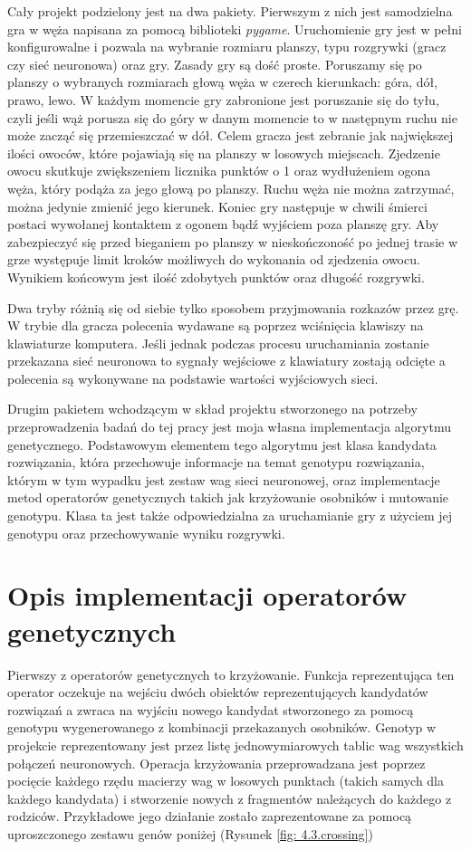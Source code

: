 \documentclass[12pt, oneside, a4paper]{report}
\begin{document}
Cały projekt podzielony jest na dwa pakiety. Pierwszym z nich jest samodzielna gra w węża napisana za pomocą biblioteki \textit{pygame}. Uruchomienie gry jest w pełni konfigurowalne i pozwala na wybranie rozmiaru planszy, typu rozgrywki (gracz czy sieć neuronowa) oraz gry. Zasady gry są dość proste. Poruszamy się po planszy o wybranych rozmiarach głową węża w czerech kierunkach: góra, dół, prawo, lewo. W każdym momencie gry zabronione jest poruszanie się do tyłu, czyli jeśli wąż porusza się do góry w danym momencie to w następnym ruchu nie może zacząć się przemieszczać w dół. Celem gracza jest zebranie jak największej ilości owoców, które pojawiają się na planszy w losowych miejscach. Zjedzenie owocu skutkuje zwiększeniem licznika punktów o 1 oraz wydłużeniem ogona węża, który podąża za jego głową po planszy. Ruchu węża nie można zatrzymać, można jedynie zmienić jego kierunek. Koniec gry następuje w chwili śmierci postaci wywołanej kontaktem z ogonem bądź wyjściem poza planszę gry. Aby zabezpieczyć się przed bieganiem po planszy w nieskończoność po jednej trasie w grze występuje limit kroków możliwych do wykonania od zjedzenia owocu. Wynikiem końcowym jest ilość zdobytych punktów oraz długość rozgrywki.

Dwa tryby różnią się od siebie tylko sposobem przyjmowania rozkazów przez grę. W trybie dla gracza polecenia wydawane są poprzez wciśnięcia klawiszy na klawiaturze komputera. Jeśli jednak podczas procesu uruchamiania zostanie przekazana sieć neuronowa to sygnały wejściowe z klawiatury zostają odcięte a polecenia są wykonywane na podstawie wartości wyjściowych sieci.

Drugim pakietem wchodzącym w skład projektu stworzonego na potrzeby przeprowadzenia badań do tej pracy jest moja własna implementacja algorytmu genetycznego. Podstawowym elementem tego algorytmu jest klasa kandydata rozwiązania, która przechowuje informacje na temat genotypu rozwiązania, którym w tym wypadku jest zestaw wag sieci neuronowej, oraz implementacje metod operatorów genetycznych takich jak krzyżowanie osobników i mutowanie genotypu. Klasa ta jest także odpowiedzialna za uruchamianie gry z użyciem jej genotypu oraz przechowywanie wyniku rozgrywki.

\section{Opis implementacji operatorów genetycznych}

Pierwszy z operatorów genetycznych to krzyżowanie. Funkcja reprezentująca ten operator oczekuje na wejściu dwóch obiektów reprezentujących kandydatów rozwiązań a zwraca na wyjściu nowego kandydat stworzonego za pomocą genotypu wygenerowanego z kombinacji przekazanych osobników. Genotyp w projekcie reprezentowany jest przez listę jednowymiarowych tablic wag wszystkich połączeń neuronowych. Operacja krzyżowania przeprowadzana jest poprzez pocięcie każdego rzędu macierzy wag w losowych punktach (takich samych dla każdego kandydata) i stworzenie nowych z fragmentów należących do każdego z rodziców. Przykładowe jego działanie zostało zaprezentowane za pomocą uproszczonego zestawu genów poniżej (Rysunek \ref{fig: 4.3.crossing})
\end{document}
